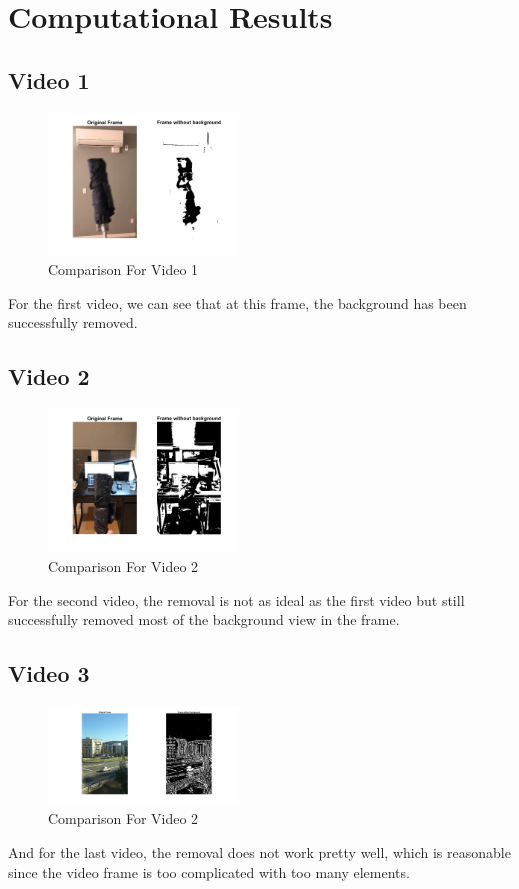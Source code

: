 \documentclass[twoside,twocolumn]{article}
\begin{document}
    \section{Computational Results}
    \subsection{Video 1}
    \begin{figure}[h]
        \includegraphics[width = 0.45\textwidth]{1.jpg}
        \caption{Comparison For Video 1}
        \label{fig:1}
    \end{figure}
    For the first video, we can see that at this frame, the background has been successfully removed.

    \subsection{Video 2}
    \begin{figure}[h]
        \includegraphics[width = 0.45\textwidth]{2.jpg}
        \caption{Comparison For Video 2}
        \label{fig:2}
    \end{figure}
    For the second video, the removal is not as ideal as the first video but still successfully removed
    most of the background view in the frame.

    \subsection{Video 3}
    \begin{figure}[h]
        \includegraphics[width = 0.45\textwidth]{3.jpg}
        \caption{Comparison For Video 2}
        \label{fig:3}
    \end{figure}
    And for the last video, the removal does not work pretty well, which is reasonable since the video frame
    is too complicated with too many elements.
    
\end{document}
